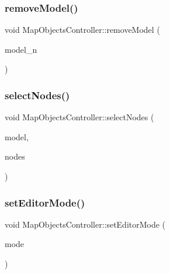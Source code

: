 \subsubsection{\texorpdfstring{removeModel()}{removeModel()}}
{\footnotesize\ttfamily void Map\+Objects\+Controller\+::remove\+Model (\begin{DoxyParamCaption}\item[{int}]{model\+\_\+n }\end{DoxyParamCaption})}

\mbox{\label{class_map_objects_controller_a1e080ffc4ca6c4fbaa76fe5d30db016d}} 
\subsubsection{\texorpdfstring{selectNodes()}{selectNodes()}}
{\footnotesize\ttfamily void Map\+Objects\+Controller\+::select\+Nodes (\begin{DoxyParamCaption}\item[{int}]{model,  }\item[{Q\+List$<$ \mbox{\hyperlink{classtypes_1_1_node_id}{types\+::\+Node\+Id}} $>$}]{nodes }\end{DoxyParamCaption})}

\mbox{\label{class_map_objects_controller_a16f39bb55ff193cbe7881aac12652672}} 
\subsubsection{\texorpdfstring{setEditorMode()}{setEditorMode()}}
{\footnotesize\ttfamily void Map\+Objects\+Controller\+::set\+Editor\+Mode (\begin{DoxyParamCaption}\item[{\mbox{\hyperlink{class_map_objects_controller_a57082b858408bbc9d2b4f0f71853e687}{Map\+Objects\+Controller\+::\+Editor\+Modes}}}]{mode }\end{DoxyParamCaption})}

\mbox{\label{class_map_objects_controller_aee5c8de6a25dd4ede075b97bc5b01d9f}} 
